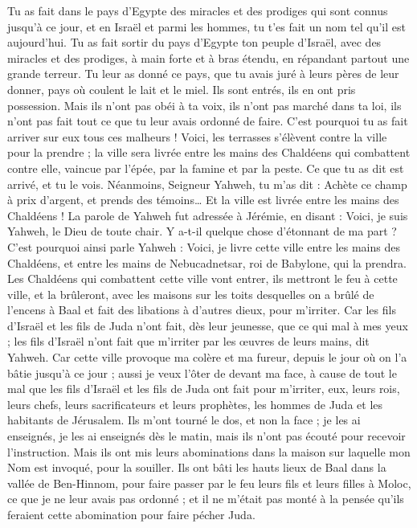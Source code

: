 \begin{multicols}{2}
Tu as fait dans le pays d'Egypte des miracles et des prodiges qui sont connus jusqu’à ce jour, et en Israël et parmi les hommes, tu t'es fait un nom tel qu'il est aujourd'hui.
Tu as fait sortir du pays d'Egypte ton peuple d’Israël, avec des miracles et des prodiges, à main forte et à bras étendu, en répandant partout une grande terreur.
Tu leur as donné ce pays, que tu avais juré à leurs pères de leur donner, pays où coulent le lait et le miel.
Ils sont entrés, ils en ont pris possession. Mais ils n'ont pas obéi à ta voix, ils n'ont pas marché dans ta loi, ils n'ont pas fait tout ce que tu leur avais ordonné de faire. C'est pourquoi tu as fait arriver sur eux tous ces malheurs !
Voici, les terrasses s’élèvent contre la ville pour la prendre ; la ville sera livrée entre les mains des Chaldéens qui combattent contre elle, vaincue par l'épée, par la famine et par la peste. Ce que tu as dit est arrivé, et tu le vois.
Néanmoins, Seigneur Yahweh, tu m'as dit : Achète ce champ à prix d'argent, et prends des témoins… Et la ville est livrée entre les mains des Chaldéens !
La parole de Yahweh fut adressée à Jérémie, en disant :
Voici, je suis Yahweh, le Dieu de toute chair. Y a-t-il quelque chose d’étonnant de ma part ?
C'est pourquoi ainsi parle Yahweh : Voici, je livre cette ville entre les mains des Chaldéens, et entre les mains de Nebucadnetsar, roi de Babylone, qui la prendra.
Les Chaldéens qui combattent cette ville vont entrer, ils mettront le feu à cette ville, et la brûleront, avec les maisons sur les toits desquelles on a brûlé de l’encens à Baal et fait des libations à d'autres dieux, pour m’irriter.
Car les fils d'Israël et les fils de Juda n'ont fait, dès leur jeunesse, que ce qui mal à mes yeux ; les fils d'Israël n’ont fait que m’irriter par les œuvres de leurs mains, dit Yahweh.
Car cette ville provoque ma colère et ma fureur, depuis le jour où on l'a bâtie jusqu’à ce jour ; aussi je veux l'ôter de devant ma face,
à cause de tout le mal que les fils d'Israël et les fils de Juda ont fait pour m’irriter, eux, leurs rois, leurs chefs, leurs sacrificateurs et leurs prophètes, les hommes de Juda et les habitants de Jérusalem.
Ils m'ont tourné le dos, et non la face ; je les ai enseignés, je les ai enseignés dès le matin, mais ils n'ont pas écouté pour recevoir l’instruction.
Mais ils ont mis leurs abominations dans la maison sur laquelle mon Nom est invoqué, pour la souiller.
Ils ont bâti les hauts lieux de Baal dans la vallée de Ben-Hinnom, pour faire passer par le feu leurs fils et leurs filles à Moloc, ce que je ne leur avais pas ordonné ; et il ne m'était pas monté à la pensée qu'ils feraient cette abomination pour faire pécher Juda.

\end{multicols}
